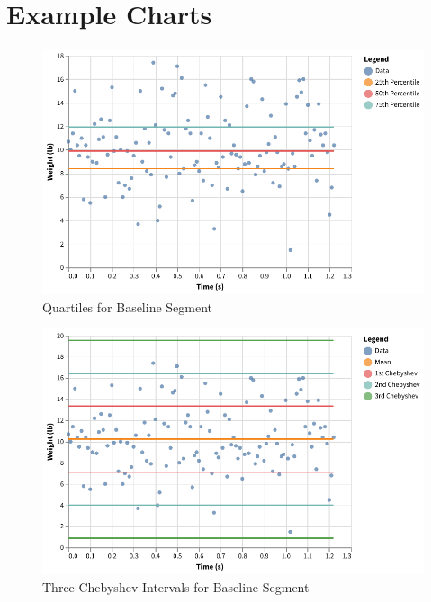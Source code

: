 \section{Example Charts}
%
\begin{figure}[ht]
    \centering
    \includegraphics{chart/00-intro/baseline-quartiles.pdf}
    \caption{Quartiles for Baseline Segment}
    \label{figure:00.baseline.quartiles}
\end{figure}
%
\begin{figure}[ht]
    \centering
    \includegraphics{chart/00-intro/baseline-chebyshev.pdf}
    \caption{Three Chebyshev Intervals for Baseline Segment}
    \label{figure:00.baseline.chebyshev}
\end{figure}
%
